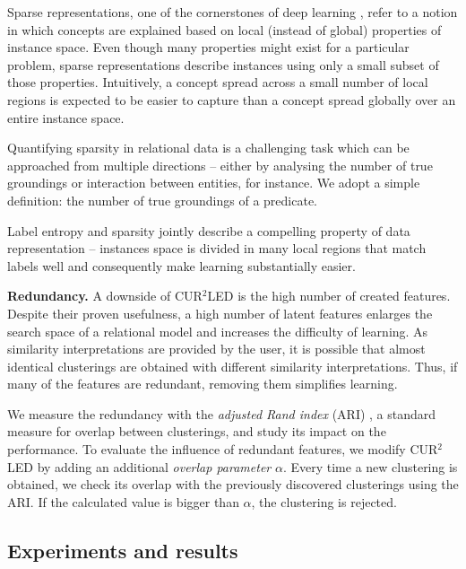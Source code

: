Sparse representations, one of the cornerstones of deep learning \cite{Bengio2013RLR}, refer to a notion in which concepts are explained based on local (instead of global) properties of instance space.
Even though many properties might exist for a particular problem, sparse representations describe instances using only a small subset of those properties. 
Intuitively, a concept spread across a small number of local regions is expected to be easier to capture than a concept spread globally over an entire instance space.



Quantifying sparsity in relational data is a challenging task which can be approached from multiple directions -- either by analysing the number of true groundings or interaction between entities, for instance.
We adopt a simple definition: the number of true groundings of a predicate.


Label entropy and sparsity jointly describe a compelling property of data representation --  instances space is divided in many local regions that match labels well  and consequently make learning substantially easier.



\textbf{Redundancy.} 
A downside of CUR$^2$LED is the high number of  created features. 
Despite their proven usefulness, a high number of latent features enlarges the search space of a relational model and increases the difficulty of learning.
As similarity interpretations are provided by the user, it is possible that almost identical clusterings are obtained with different similarity interpretations.
Thus, if many of the features are redundant, removing them simplifies learning.

We measure the redundancy with the \textit{adjusted Rand index} (ARI) \cite{Rand71,MoreyARI}, a standard measure for overlap between clusterings, and study its impact on the performance.
To evaluate the influence of redundant features, we modify CUR$^2$LED by adding an additional \textit{overlap parameter} $\alpha$.
Every time a new clustering is obtained, we check its overlap with the previously discovered clusterings using the ARI.
If the calculated value is bigger than $\alpha$, the clustering is rejected.



\subsection{Experiments and results}

